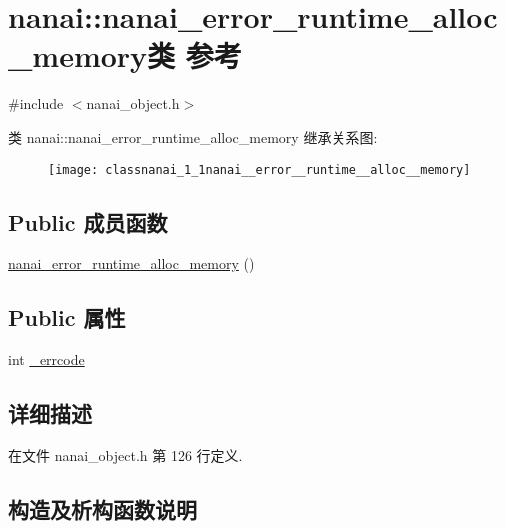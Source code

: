 \hypertarget{classnanai_1_1nanai__error__runtime__alloc__memory}{}\section{nanai\+:\+:nanai\+\_\+error\+\_\+runtime\+\_\+alloc\+\_\+memory类 参考}
\label{classnanai_1_1nanai__error__runtime__alloc__memory}


{\ttfamily \#include $<$nanai\+\_\+object.\+h$>$}

类 nanai\+:\+:nanai\+\_\+error\+\_\+runtime\+\_\+alloc\+\_\+memory 继承关系图\+:\begin{figure}[H]
\begin{center}
\leavevmode
\texttt{[image: classnanai\_1\_1nanai\_\_error\_\_runtime\_\_alloc\_\_memory]}
\end{center}
\end{figure}
\subsection*{Public 成员函数}
\begin{DoxyCompactItemize}
\item 
\hyperlink{classnanai_1_1nanai__error__runtime__alloc__memory_aa638631a5e632fc47409027525c58401}{nanai\+\_\+error\+\_\+runtime\+\_\+alloc\+\_\+memory} ()
\end{DoxyCompactItemize}
\subsection*{Public 属性}
\begin{DoxyCompactItemize}
\item 
int \hyperlink{classnanai_1_1nanai__error__runtime__alloc__memory_a3212283dfac6316bc3ac8e3c2f7578df}{\+\_\+errcode}
\end{DoxyCompactItemize}


\subsection{详细描述}


在文件 nanai\+\_\+object.\+h 第 126 行定义.



\subsection{构造及析构函数说明}
\hypertarget{classnanai_1_1nanai__error__runtime__alloc__memory_aa638631a5e632fc47409027525c58401}{}
